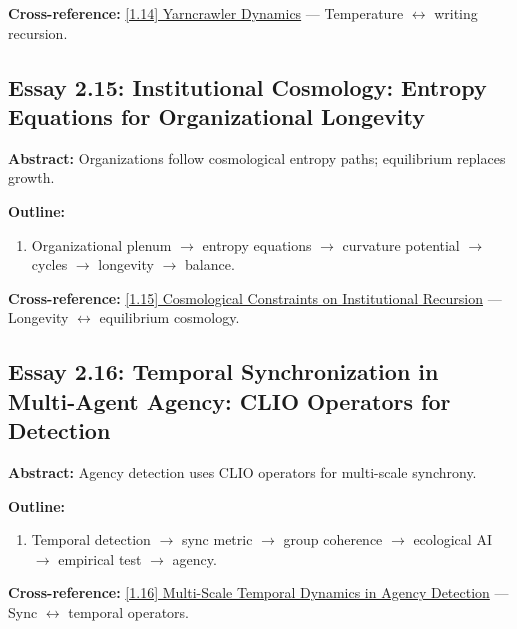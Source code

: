 \documentclass[12pt,a4paper]{article}
\begin{document}
\textbf{Cross-reference:} \hyperref[sec:essay1-14]{[1.14] Yarncrawler Dynamics} --- Temperature $\leftrightarrow$ writing recursion.

\subsection{Essay 2.15: Institutional Cosmology: Entropy Equations for Organizational Longevity}
\label{sec:essay2-15}

\textbf{Abstract:} Organizations follow cosmological entropy paths; equilibrium replaces growth.

\textbf{Outline:}
\begin{enumerate}
\item Organizational plenum $\to$ entropy equations $\to$ curvature potential $\to$ cycles $\to$ longevity $\to$ balance.
\end{enumerate}

\textbf{Cross-reference:} \hyperref[sec:essay1-15]{[1.15] Cosmological Constraints on Institutional Recursion} --- Longevity $\leftrightarrow$ equilibrium cosmology.

\subsection{Essay 2.16: Temporal Synchronization in Multi-Agent Agency: CLIO Operators for Detection}
\label{sec:essay2-16}

\textbf{Abstract:} Agency detection uses CLIO operators for multi-scale synchrony.

\textbf{Outline:}
\begin{enumerate}
\item Temporal detection $\to$ sync metric $\to$ group coherence $\to$ ecological AI $\to$ empirical test $\to$ agency.
\end{enumerate}

\textbf{Cross-reference:} \hyperref[sec:essay1-16]{[1.16] Multi-Scale Temporal Dynamics in Agency Detection} --- Sync $\leftrightarrow$ temporal operators.

\end{document}

